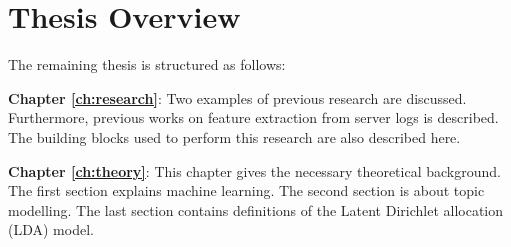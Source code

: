 \begin{comment}

How do we define similair messages?

Can we cluster these error messages to find patterns?

Wat ik zou verwachten in je scriptie zijn de volgende topics
•	Wat is het probleem (de probleemstelling)?
•	Welke mogelijkheden zijn er om dit probleem op te lossen?
•	Welke methode heb je gekozen, en vooral uitleggen waarom deze methode volgens jou de beste is?
•	Hoe heb je vastgesteld dat de gekozen oplossing de beste is?
•	Wat is de uitkomst?
•	Wat zijn de voor en nadelen van het gekozen model, wat zijn de beperkingen, wat is de optimale modelering en waarom?
Zijn deze onderwerpen voldoende afgedicht in onderstaande structuur?

Ik ben veel meer geïnteresseerd in de onderbouwing:
•	Wat is de (onze) probleem omschrijving
Finding structures in syslogs to cluster undiscovered syslogs with errors
•	Waarom kies je LDA om dit probleem te lijf te gaan
o	Pro’s / con’s
o	Alternatieven
•	Hoe moet LDA gebruikt worden
o	Welke specifieke tuning heb je gebruikt
o	Hoe beinvloed de aanpassingen van parameters de uitkomst


\textbf{Can we make a reliable model for error detection in system logs?}

 \end{comment}
 
\section{Thesis Overview} \label{introduction:thesisoverview}
The remaining thesis is structured as follows:

\setlength{\parindent}{3ex} \textbf{Chapter \ref{ch:research}}: Two examples of previous research are discussed. Furthermore, previous works on feature extraction from server logs is described. The building blocks used to perform this research are also described here.


\textbf{Chapter \ref{ch:theory}}: This chapter gives the necessary theoretical background. The first section explains machine learning. The second section is about topic modelling. The last section contains definitions of the Latent Dirichlet allocation (LDA) model. 


\begin{comment}
natural language processing, feature extraction, types of system logs, the application of machine learning, general machine learning knowledge 
\end{comment}

